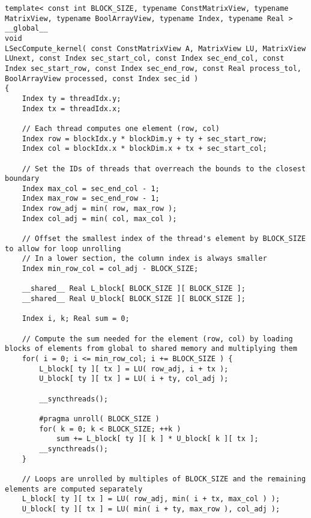 \begin{lstlisting}[caption={The implementation of the \code{LSecCompute\_kernel()} kernel which computes one iteration of a lower section. Note that the matrices, vectors, and arrays are passed using their views, and the scalar values are copied to the local memory of each thread.},label={Listing:ICMxPP-implementation->kernels->lower-section-compute}]
template< const int BLOCK_SIZE, typename ConstMatrixView, typename MatrixView, typename BoolArrayView, typename Index, typename Real >
__global__
void
LSecCompute_kernel( const ConstMatrixView A, MatrixView LU, MatrixView LUnext, const Index sec_start_col, const Index sec_end_col, const Index sec_start_row, const Index sec_end_row, const Real process_tol, BoolArrayView processed, const Index sec_id )
{
	Index ty = threadIdx.y;
	Index tx = threadIdx.x;
	
	// Each thread computes one element (row, col)
	Index row = blockIdx.y * blockDim.y + ty + sec_start_row;
	Index col = blockIdx.x * blockDim.x + tx + sec_start_col;
	
	// Set the IDs of threads that overreach the bounds to the closest boundary
	Index max_col = sec_end_col - 1;
	Index max_row = sec_end_row - 1;
	Index row_adj = min( row, max_row );
	Index col_adj = min( col, max_col );
	
	// Offset the smallest index of the thread's element by BLOCK_SIZE to allow for loop unrolling
	// In a lower section, the column index is always smaller
	Index min_row_col = col_adj - BLOCK_SIZE;
	
	__shared__ Real L_block[ BLOCK_SIZE ][ BLOCK_SIZE ];
	__shared__ Real U_block[ BLOCK_SIZE ][ BLOCK_SIZE ];
	
	Index i, k; Real sum = 0;
	
	// Compute the sum needed for the element (row, col) by loading blocks of elements from global to shared memory and multiplying them
	for( i = 0; i <= min_row_col; i += BLOCK_SIZE ) {
		L_block[ ty ][ tx ] = LU( row_adj, i + tx );
		U_block[ ty ][ tx ] = LU( i + ty, col_adj );
		
		__syncthreads();
		
		#pragma unroll( BLOCK_SIZE )
		for( k = 0; k < BLOCK_SIZE; ++k )
			sum += L_block[ ty ][ k ] * U_block[ k ][ tx ];
		__syncthreads();
	}
	
	// Loops are unrolled by multiples of BLOCK_SIZE and the remaining elements are computed separately
	L_block[ ty ][ tx ] = LU( row_adj, min( i + tx, max_col ) );
	U_block[ ty ][ tx ] = LU( min( i + ty, max_row ), col_adj );
	

\end{lstlisting}
